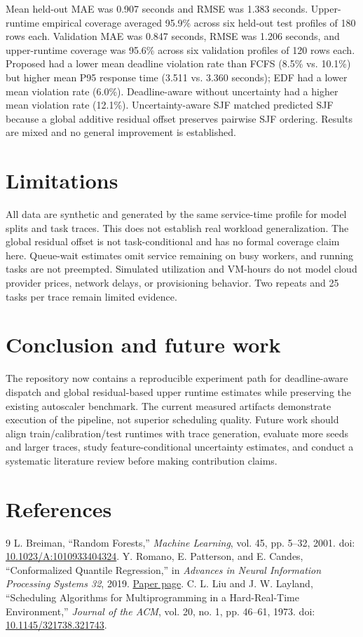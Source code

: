 \documentclass[11pt]{article}
\begin{document}
Mean held-out MAE was 0.907 seconds and RMSE was 1.383 seconds. Upper-runtime empirical coverage averaged 95.9\% across six held-out test profiles of 180 rows each. Validation MAE was 0.847 seconds, RMSE was 1.206 seconds, and upper-runtime coverage was 95.6\% across six validation profiles of 120 rows each. Proposed had a lower mean deadline violation rate than FCFS (8.5\% vs. 10.1\%) but higher mean P95 response time (3.511 vs. 3.360 seconds); EDF had a lower mean violation rate (6.0\%). Deadline-aware without uncertainty had a higher mean violation rate (12.1\%). Uncertainty-aware SJF matched predicted SJF because a global additive residual offset preserves pairwise SJF ordering. Results are mixed and no general improvement is established.

\section{Limitations}
All data are synthetic and generated by the same service-time profile for model splits and task traces. This does not establish real workload generalization. The global residual offset is not task-conditional and has no formal coverage claim here. Queue-wait estimates omit service remaining on busy workers, and running tasks are not preempted. Simulated utilization and VM-hours do not model cloud provider prices, network delays, or provisioning behavior. Two repeats and 25 tasks per trace remain limited evidence.

\section{Conclusion and future work}
The repository now contains a reproducible experiment path for deadline-aware dispatch and global residual-based upper runtime estimates while preserving the existing autoscaler benchmark. The current measured artifacts demonstrate execution of the pipeline, not superior scheduling quality. Future work should align train/calibration/test runtimes with trace generation, evaluate more seeds and larger traces, study feature-conditional uncertainty estimates, and conduct a systematic literature review before making contribution claims.

\section{References}
\begin{thebibliography}{9}
 L. Breiman, ``Random Forests,'' \emph{Machine Learning}, vol. 45, pp. 5--32, 2001. doi: \href{https://doi.org/10.1023/A:1010933404324}{10.1023/A:1010933404324}.
 Y. Romano, E. Patterson, and E. Candes, ``Conformalized Quantile Regression,'' in \emph{Advances in Neural Information Processing Systems 32}, 2019. \href{https://papers.nips.cc/paper/2019/hash/5103c3584b063c431bd1268e9b5e76fb-Abstract.html}{Paper page}.
 C. L. Liu and J. W. Layland, ``Scheduling Algorithms for Multiprogramming in a Hard-Real-Time Environment,'' \emph{Journal of the ACM}, vol. 20, no. 1, pp. 46--61, 1973. doi: \href{https://doi.org/10.1145/321738.321743}{10.1145/321738.321743}.
\end{thebibliography}
\end{document}
